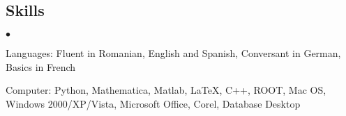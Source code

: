 \documentclass[margin,line]{res}
\newenvironment{list2}{
  \begin{list}{$\bullet$}{%
      \setlength{\itemsep}{0in}
      \setlength{\parsep}{0in} \setlength{\parskip}{0in}
      \setlength{\topsep}{0in} \setlength{\partopsep}{0in} 
      \setlength{\leftmargin}{0.2in}}}{\end{list}}
\begin{document}
\begin{resume}
\section{\sc Skills}
\begin{list2}
\item[] Languages: Fluent in Romanian, English and Spanish, Conversant in German, Basics in French
\item[] Computer: Python, Mathematica, Matlab, LaTeX, C++, ROOT, Mac OS, Windows 2000/XP/Vista, Microsoft Office, Corel, Database Desktop
\end{list2}








\end{resume}
\end{document}

